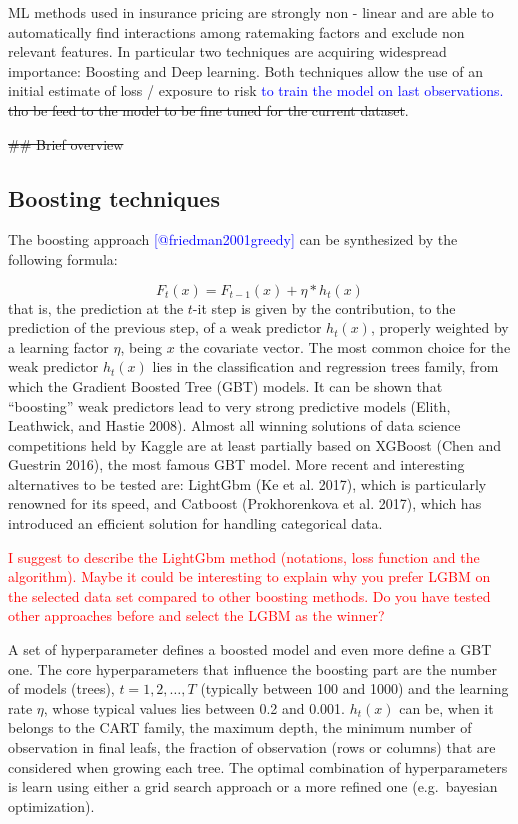 \documentclass[
]{article}
\begin{document}
ML methods used in insurance pricing are strongly non - linear and are
able to automatically find interactions among ratemaking factors and
exclude non relevant features. In particular two techniques are
acquiring widespread importance: Boosting and Deep learning. Both
techniques allow the use of an initial estimate of loss / exposure to
risk \textcolor{blue}{to train the model on last observations.}
\sout{tho be feed to the model to be fine tuned for the current
dataset}.

\sout{\#\# Brief overview}

\hypertarget{boosting-techniques}{%
\subsection{Boosting techniques}\label{boosting-techniques}}

The boosting approach \textcolor{blue}{[@friedman2001greedy]} can be
synthesized by the following formula:

\[F_t\left(x\right)=F_{t-1}\left(x\right)+\eta*h_t\left(x\right)\] that
is, the prediction at the \(t\)-it step is given by the contribution, to
the prediction of the previous step, of a weak predictor
\(h_t\left(x\right)\), properly weighted by a learning factor \(\eta\),
being \(x\) the covariate vector. The most common choice for the weak
predictor \(h_t\left(x\right)\) lies in the classification and
regression trees family, from which the Gradient Boosted Tree (GBT)
models. It can be shown that ``boosting'' weak predictors lead to very
strong predictive models (Elith, Leathwick, and Hastie 2008). Almost all
winning solutions of data science competitions held by Kaggle are at
least partially based on XGBoost (Chen and Guestrin 2016), the most
famous GBT model. More recent and interesting alternatives to be tested
are: LightGbm (Ke et al. 2017), which is particularly renowned for its
speed, and Catboost (Prokhorenkova et al. 2017), which has introduced an
efficient solution for handling categorical data.

\textcolor{red}{I suggest to describe the LightGbm method (notations, loss function and the algorithm). Maybe it could be interesting to explain why you prefer LGBM on the selected data set compared to other boosting methods. Do you have tested other approaches before and select the LGBM as the winner?}

A set of hyperparameter defines a boosted model and even more define a
GBT one. The core hyperparameters that influence the boosting part are
the number of models (trees), \(t=1,2,\ldots, T\) (typically between 100
and 1000) and the learning rate \(\eta\), whose typical values lies
between 0.2 and 0.001. \(h_t\left(x\right)\) can be, when it belongs to
the CART family, the maximum depth, the minimum number of observation in
final leafs, the fraction of observation (rows or columns) that are
considered when growing each tree. The optimal combination of
hyperparameters is learn using either a grid search approach or a more
refined one (e.g.~bayesian optimization).
\end{document}
